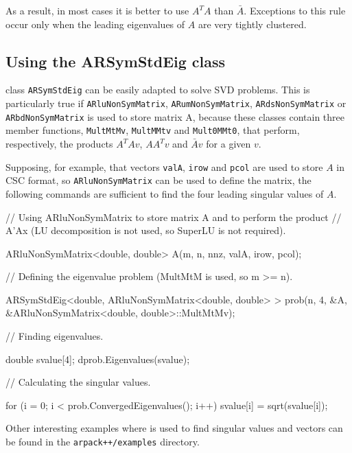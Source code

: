 As a result, in most cases it is better to use $A^{T} A$ than $\bar{A}$. Exceptions to this rule occur only when the leading eigenvalues of $A$ are very tightly clustered.

\subsection{Using the ARSymStdEig class}

\ARPP{} class \texttt{ARSymStdEig} can be easily adapted to solve SVD problems. This is particularly true if \texttt{ARluNonSymMatrix}, \texttt{ARumNonSymMatrix}, \texttt{ARdsNonSymMatrix} or \texttt{ARbdNonSymMatrix} is used to store matrix A, because these classes contain three member functions, \texttt{MultMtMv}, \texttt{MultMMtv} and \texttt{Mult0MMt0}, that perform, respectively, the products $A^{T}Av$, $AA^{T}v$ and $\bar{A}v$ for a given $v$.

Supposing, for example, that vectors \texttt{valA}, \texttt{irow} and \texttt{pcol} are used to store $A$ in CSC format, so \texttt{ARluNonSymMatrix} can be used to define the matrix, the following commands are sufficient to find the four leading singular values of $A$.
\begin{cppcode}
// Using ARluNonSymMatrix to store matrix A and to perform the product 
// A'Ax (LU decomposition is not used, so SuperLU is not required).

ARluNonSymMatrix<double, double> A(m, n, nnz, valA, irow, pcol);

// Defining the eigenvalue problem (MultMtM is used, so m >= n).

ARSymStdEig<double, ARluNonSymMatrix<double, double> >
prob(n, 4, &A, &ARluNonSymMatrix<double, double>::MultMtMv);

// Finding eigenvalues.

double svalue[4];
dprob.Eigenvalues(svalue);

// Calculating the singular values.

for (i = 0; i < prob.ConvergedEigenvalues(); i++) {
	svalue[i] = sqrt(svalue[i]);
}
\end{cppcode}
Other interesting examples where \ARPP{} is used to find singular values and vectors can be found in the \texttt{arpack++/examples} directory.

